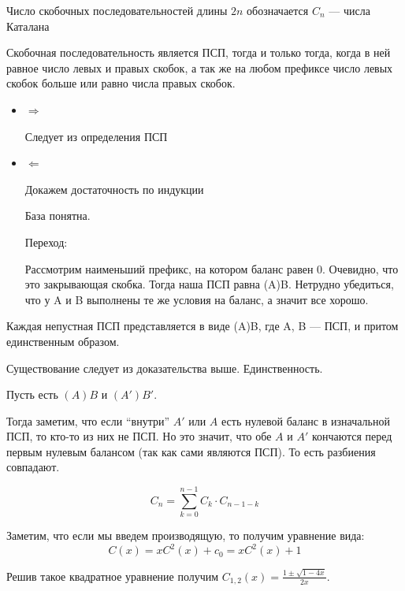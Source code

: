 Число скобочных последовательностей длины \( 2n \) обозначается \( C_n \) --- числа Каталана

\begin{thrm}{}{}
    Скобочная последовательность является ПСП, тогда и только тогда,
    когда в ней равное число левых и правых скобок,
    а так же на любом префиксе число левых скобок больше или равно числа правых скобок.
\end{thrm}

\begin{itemize}
    \item
        \( \Rightarrow \)

        Следует из определения ПСП
    \item
        \( \Leftarrow \)

        Докажем достаточность по индукции

        База понятна.

        Переход:

        Рассмотрим наименьший префикс, на котором баланс равен \( 0 \).
        Очевидно, что это закрывающая скобка.
        Тогда наша ПСП равна (A)B.
        Нетрудно убедиться, что у A и B выполнены те же условия на баланс, а значит все хорошо.
\end{itemize}

\begin{coroll}{}{}
    Каждая непустная ПСП представляется в виде (A)B, где A, B --- ПСП, и притом единственным образом.
\end{coroll}

Существование следует из доказательства выше.
Единственность.

Пусть есть \( (A)B \) и \( (A') B' \).

Тогда заметим, что если ``внутри'' \( A' \) или \( A \) есть нулевой баланс в изначальной ПСП,
то кто-то из них не ПСП.
Но это значит, что обе \( A \) и \( A' \) кончаются перед первым нулевым балансом (так как сами являются ПСП).
То есть разбиения совпадают.

\begin{coroll}{}{}
    \[
        C_n = \sum\limits_{k = 0}^{n - 1} C_k \cdot C_{n - 1 - k}
    \]
\end{coroll}

Заметим, что если мы введем производящую, то получим уравнение вида:
\[
    C(x) = x C^2(x) + c_0 = x C^2(x) + 1
\]

Решив такое квадратное уравнение получим \( C_{1,2} (x) = \frac{1 \pm \sqrt{1 - 4x}}{2x} \).


